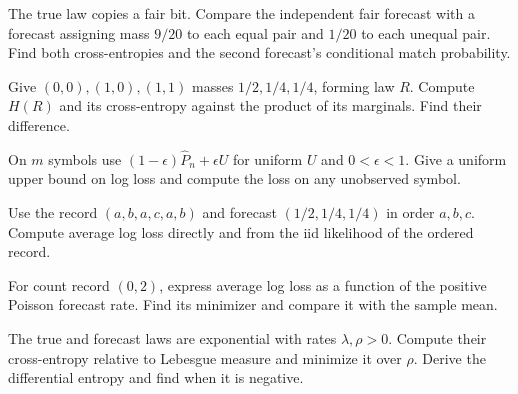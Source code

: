 \documentclass[11pt,oneside]{book}
\theoremstyle{definition}
\theoremstyle{remark}
\begin{document}
\begin{practiceexercise}
\label{wex:conditional-bit-forecast}
The true law copies a fair bit. Compare the independent fair forecast with a
forecast assigning mass $9/20$ to each equal pair and $1/20$ to each unequal
pair. Find both cross-entropies and the second forecast's conditional match
probability.
\end{practiceexercise}

\begin{practiceexercise}
\label{wex:biased-marginal-product-entropy}
Give $(0,0),(1,0),(1,1)$ masses $1/2,1/4,1/4$, forming law $R$. Compute
$H(R)$ and its cross-entropy against the product of its marginals. Find
their difference.
\end{practiceexercise}

\begin{practiceexercise}
\label{wex:smoothing-zero-masses}
On $m$ symbols use $(1-\epsilon)\widehat P_n+\epsilon U$ for uniform $U$ and
$0<\epsilon<1$. Give a uniform upper bound on log loss and compute the loss
on any unobserved symbol.
\end{practiceexercise}

\begin{practiceexercise}
\label{wex:categorical-record-cross-entropy}
Use the record $(a,b,a,c,a,b)$ and forecast $(1/2,1/4,1/4)$ in
order $a,b,c$. Compute average log loss directly and from the iid likelihood
of the ordered record.
\end{practiceexercise}

\begin{practiceexercise}
\label{wex:poisson-record-cross-entropy}
For count record $(0,2)$, express average log loss as a function of the
positive Poisson forecast rate. Find its minimizer and compare it with the
sample mean.
\end{practiceexercise}

\begin{practiceexercise}
\label{wex:exponential-cross-entropy}
The true and forecast laws are exponential with rates $\lambda,\rho>0$.
Compute their cross-entropy relative to Lebesgue measure and minimize it
over $\rho$. Derive the differential entropy and find when it is negative.
\end{practiceexercise}
\end{document}
